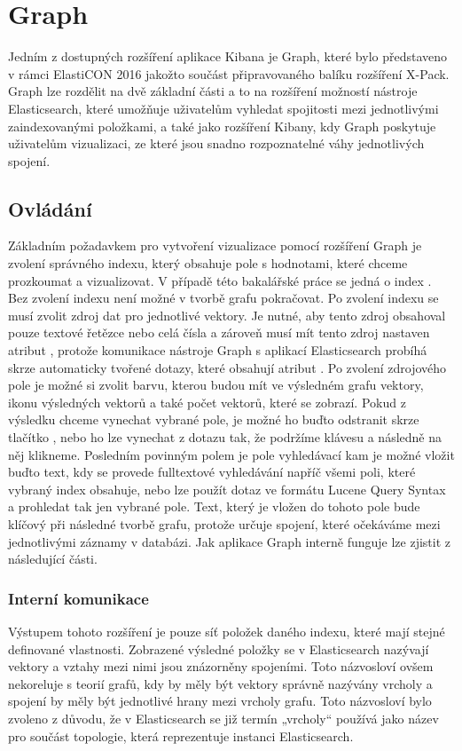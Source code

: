 \documentclass[czech,BP]{thesiskiv}
\begin{document}
	


\section{Graph}
Jedním z dostupných rozšíření aplikace Kibana je Graph, které bylo představeno v rámci ElastiCON 2016 jakožto součást připravovaného balíku rozšíření X-Pack. Graph lze rozdělit na dvě základní části a to na rozšíření možností nástroje Elasticsearch, které umožňuje uživatelům vyhledat spojitosti mezi jednotlivými zaindexovanými položkami, a také jako rozšíření Kibany, kdy Graph poskytuje uživatelům vizualizaci, ze které jsou snadno rozpoznatelné váhy jednotlivých spojení.

\subsection{Ovládání}
Základním požadavkem pro vytvoření vizualizace pomocí rozšíření Graph je zvolení správného indexu, který obsahuje pole s hodnotami, které chceme prozkoumat a vizualizovat. V případě této bakalářské práce se jedná o index . Bez zvolení indexu není možné v tvorbě grafu pokračovat. Po zvolení indexu se musí zvolit zdroj dat pro jednotlivé vektory. Je nutné, aby tento zdroj obsahoval pouze textové řetězce nebo celá čísla a zároveň musí mít tento zdroj nastaven atribut , protože komunikace nástroje Graph s aplikací Elasticsearch probíhá skrze automaticky tvořené dotazy, které obsahují atribut . Po zvolení zdrojového pole je možné si zvolit barvu, kterou budou mít ve výsledném grafu vektory, ikonu výsledných vektorů a také počet vektorů, které se zobrazí. Pokud z výsledku chceme vynechat vybrané pole, je možné ho buďto odstranit skrze tlačítko , nebo ho lze vynechat z dotazu tak, že podržíme klávesu  a následně na něj klikneme.  Posledním povinným polem je pole vyhledávací kam je možné vložit buďto text, kdy se provede fulltextové vyhledávání napříč všemi poli, které vybraný index obsahuje, nebo lze použít dotaz ve formátu Lucene Query Syntax a prohledat tak jen vybrané pole. Text, který je vložen do tohoto pole bude klíčový při následné tvorbě grafu, protože určuje spojení, které očekáváme mezi jednotlivými záznamy v databázi. Jak aplikace Graph interně funguje lze zjistit z následující části.

\subsubsection{Interní komunikace}
Výstupem tohoto rozšíření je pouze síť položek daného indexu, které mají stejné definované vlastnosti. Zobrazené výsledné položky se v Elasticsearch nazývají vektory a vztahy mezi nimi jsou znázorněny spojeními. Toto názvosloví ovšem nekoreluje s teorií grafů, kdy by měly být vektory správně nazývány vrcholy a spojení by měly být jednotlivé hrany mezi vrcholy grafu. Toto názvosloví bylo zvoleno z důvodu, že v Elasticsearch se již termín „vrcholy“ používá jako název pro součást topologie, která reprezentuje instanci Elasticsearch. 
\end{document}

